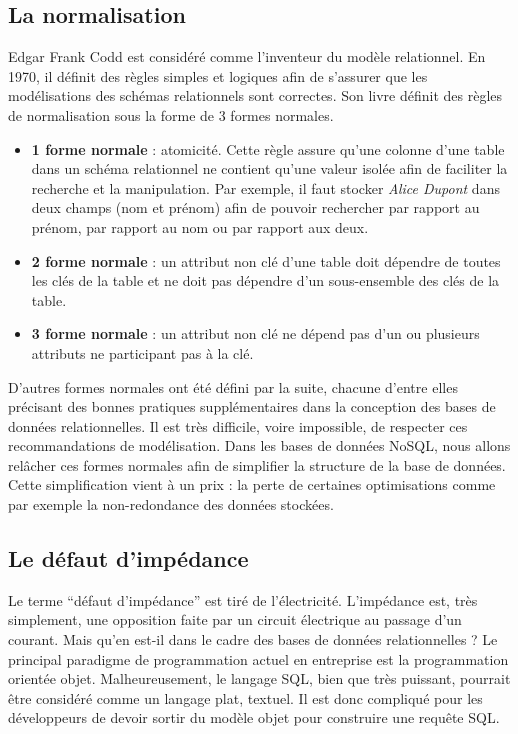 \subsection{La normalisation}

    Edgar Frank Codd est considéré comme l'inventeur du modèle relationnel. En 1970, il définit des règles simples et logiques afin de s'assurer que les modélisations des schémas relationnels sont correctes\cite{Wikipedia_Edgar_Frank_Codd}. Son livre définit des règles de normalisation sous la forme de 3 formes normales.
    \vspace{10px}
    \begin{itemize}
      \item \textbf{1\iere{} forme normale} : atomicité. Cette règle assure qu'une colonne d'une table dans un schéma relationnel ne contient qu'une valeur isolée afin de faciliter la recherche et la manipulation. Par exemple, il faut stocker \textit{Alice Dupont} dans deux champs (nom et prénom) afin de pouvoir rechercher par rapport au prénom, par rapport au nom ou par rapport aux deux.
      \item \textbf{2\ieme{} forme normale} : un attribut non clé d'une table doit dépendre de toutes les clés de la table et ne doit pas dépendre d'un sous-ensemble des clés de la table.
      \item \textbf{3\ieme{} forme normale} : un attribut non clé ne dépend pas d'un ou plusieurs attributs ne participant pas à la clé.
    \end{itemize}
    \vspace{20px}
    D'autres formes normales ont été défini par la suite, chacune d'entre elles précisant des bonnes pratiques supplémentaires dans la conception des bases de données relationnelles. Il est très difficile, voire impossible, de respecter ces recommandations de modélisation. Dans les bases de données NoSQL, nous allons relâcher ces formes normales afin de simplifier la structure de la base de données. Cette simplification vient à un prix : la perte de certaines optimisations comme par exemple la non-redondance des données stockées.

\subsection{Le défaut d'impédance}

  Le terme \enquote{défaut d'impédance} est tiré de l'électricité. L'impédance est, très simplement, une opposition faite par un circuit électrique au passage d'un courant. Mais qu'en est-il dans le cadre des bases de données relationnelles ? Le principal paradigme de programmation actuel en entreprise est la programmation orientée objet. Malheureusement, le langage SQL, bien que très puissant, pourrait être considéré comme un langage plat, textuel. Il est donc compliqué pour les développeurs de devoir sortir du modèle objet pour construire une requête SQL.\\

